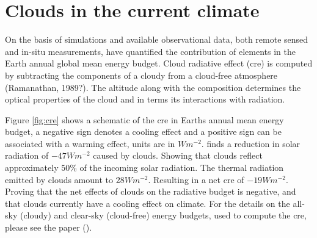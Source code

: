 \section{Clouds in the current climate} \label{sec:intro_cloud_current_climate}

On the basis of simulations and available observational data, both remote sensed and in-situ measurements, \citeauthor{Wild2019TheModels} have quantified the contribution of elements in the Earth annual global mean energy budget. Cloud radiative effect (\acrshort{cre}) is computed by subtracting the components of a cloudy from a cloud-free atmosphere (Ramanathan, 1989?). The altitude along with the composition determines the optical properties of the cloud and in terms its interactions with radiation.

Figure \ref{fig:cre} shows a schematic of the \acrshort{cre} in Earths annual mean energy budget, a negative sign denotes a cooling effect and a positive sign can be associated with a warming effect, units are in $W m^{-2}$. \citeauthor{Wild2019TheModels} finds a reduction in solar radiation of $-47Wm^{-2}$ caused by clouds. Showing that clouds reflect approximately 50\% of the incoming solar radiation. The thermal radiation emitted by clouds amount to $28Wm^{-2}$. Resulting in a net \acrshort{cre} of $-19Wm^{-2}$. Proving that the net effects of clouds on the radiative budget is negative, and that clouds currently have a cooling effect on climate. For the details on the all-sky (cloudy) and clear-sky (cloud-free) energy budgets, used to compute the \acrshort{cre}, please see the paper (\cite{Wild2019TheModels}). %


